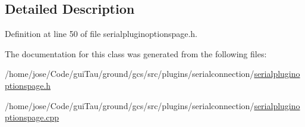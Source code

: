 \subsection{Detailed Description}


Definition at line 50 of file serialpluginoptionspage.\-h.



The documentation for this class was generated from the following files\-:\begin{DoxyCompactItemize}
\item 
/home/jose/\-Code/gui\-Tau/ground/gcs/src/plugins/serialconnection/\hyperlink{serialpluginoptionspage_8h}{serialpluginoptionspage.\-h}\item 
/home/jose/\-Code/gui\-Tau/ground/gcs/src/plugins/serialconnection/\hyperlink{serialpluginoptionspage_8cpp}{serialpluginoptionspage.\-cpp}\end{DoxyCompactItemize}
